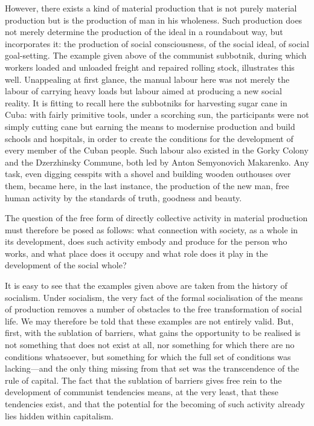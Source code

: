 \documentclass[12pt,a4paper,openany]{book}
\begin{document}
However, there exists a kind of material production that is not purely material production but is the production of man in his wholeness. Such production does not merely determine the production of the ideal in a roundabout way, but incorporates it: the production of social consciousness, of the social ideal, of social goal-setting. The example given above of the communist subbotnik, during which workers loaded and unloaded freight and repaired rolling stock, illustrates this well. Unappealing at first glance, the manual labour here was not merely the labour of carrying heavy loads but labour aimed at producing a new social reality. It is fitting to recall here the subbotniks for harvesting sugar cane in Cuba: with fairly primitive tools, under a scorching sun, the participants were not simply cutting cane but earning the means to modernise production and build schools and hospitals, in order to create the conditions for the development of every member of the Cuban people. Such labour also existed in the Gorky Colony and the Dzerzhinsky Commune, both led by Anton Semyonovich Makarenko. Any task, even digging cesspits with a shovel and building wooden outhouses over them, became here, in the last instance, the production of the new man, free human activity by the standards of truth, goodness and beauty.

The question of the free form of directly collective activity in material production must therefore be posed as follows: what connection with society, as a whole in its development, does such activity embody and produce for the person who works, and what place does it occupy and what role does it play in the development of the social whole?

It is easy to see that the examples given above are taken from the history of socialism. Under socialism, the very fact of the formal socialisation of the means of production removes a number of obstacles to the free transformation of social life. We may therefore be told that these examples are not entirely valid. But, first, with the sublation of barriers, what gains the opportunity to be realised is not something that does not exist at all, nor something for which there are no conditions whatsoever, but something for which the full set of conditions was lacking—and the only thing missing from that set was the transcendence of the rule of capital. The fact that the sublation of barriers gives free rein to the development of communist tendencies means, at the very least, that these tendencies exist, and that the potential for the becoming of such activity already lies hidden within capitalism.
\end{document}
